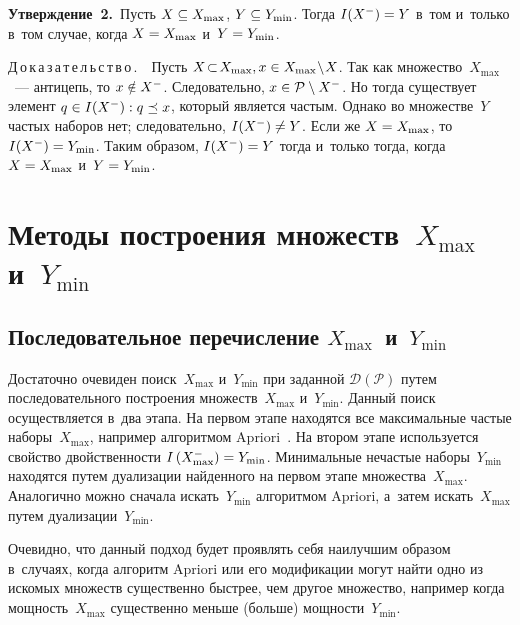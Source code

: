 \begin{multicols}{2}
\smallskip

\noindent
\textbf{Утверждение~2.}\
    Пусть $X \hm\subseteq X_{\max}$, $Y\hm \subseteq Y_{\min}$. 
    Тогда $I(X^-) \hm= Y$ в~том и~только в~том случае, когда $X \hm= X_{\max}$ и~$Y \hm= Y_{\min}$.


\smallskip


  \noindent
    Д\,о\,к\,а\,з\,а\,т\,е\,л\,ь\,с\,т\,в\,о\,.\  \
    Пусть $X\! \subset\! X_{\max}, x \hm\in X_{\max}\!\setminus\!X$.
     Так как множество~$X_{\max}$~--- антицепь, то $x \hm\notin X^-$. 
     Следовательно, $x \hm\in \mathcal{P} \setminus X^{-}$.
      Но тогда существует элемент $ q \hm\in I(X^-) : q \preceq x$, 
      который является час\-тым. Однако во множестве~$Y$ частых наборов нет; следовательно, $I(X^-) \hm\neq Y$. 
      Если же $X \hm= X_{\max}$, то $I(X^-) \hm= Y_{\min}$. Таким образом, $I(X^-) \hm= Y$ тогда и~только
       тогда, когда $X \hm= X_{\max}$ и~$Y\hm = Y_{\min}$.


    
    \section{Методы построения множеств~$X_{\max}$ и~$Y_{\min}$}

    \subsection{Последовательное перечисление $X_{\max}$~и~$Y_{\min}$}

    Достаточно очевиден поиск~$X_{\max}$ и~$Y_{\min}$ при заданной $\mathcal{D} (\mathcal{P})$ 
    путем последовательного по\-стро\-ения множеств~$X_{\max}$ и~$Y_{\min}$. 
    Данный поиск осуществляется в~два этапа. На первом этапе находятся все максимальные частые 
    наборы~$X_{\max}$, например алгоритмом Apriori~\cite{2}. На втором этапе  используется свойство 
    двойственности $I \left(X_{\max}^- \right)\hm = Y_{\min}$. 
    Минимальные нечастые наборы~$Y_{\min}$ находятся путем дуализации найденного на первом этапе 
    множества~$X_{\max}$. Аналогично можно сначала искать~$Y_{\min}$ алгоритмом Apriori, а~затем 
    искать~$X_{\max}$ путем дуализации~$Y_{\min}$.

    Очевидно, что данный подход будет проявлять себя наилучшим образом в~случаях, когда 
    алгоритм Apriori или его модификации могут найти одно из искомых множеств существенно
     быст\-рее, чем другое множество, например когда мощ\-ность~$X_{\max}$ 
     существенно меньше (больше) мощ\-ности~$Y_{\min}$.
    

\end{multicols}
